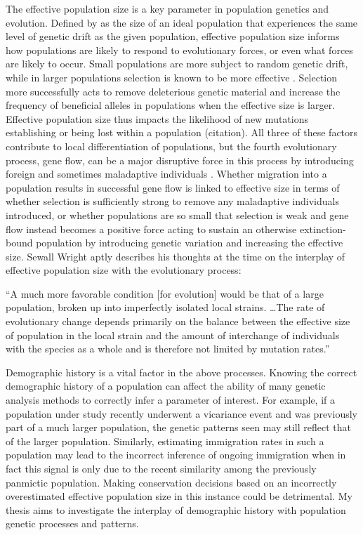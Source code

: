 The effective population size is a key parameter in population genetics and evolution. Defined by \citet{Wright:1931} as the size of an ideal population that experiences the same level of genetic drift as the given population, effective population size informs how populations are likely to respond to evolutionary forces, or even what forces are likely to occur. Small populations are more subject to random genetic drift, while in larger populations selection is known to be more effective \citep{Gravel:2016}. Selection more successfully acts to remove deleterious genetic material and increase the frequency of beneficial alleles in populations when the effective size is larger. Effective population size thus impacts the likelihood of new mutations establishing or being lost within a population (\color{red}citation\color{black}). All three of these factors contribute to local differentiation of populations, but the fourth evolutionary process, gene flow, can be a major disruptive force in this process by introducing foreign and sometimes maladaptive individuals \citep{Slatkin:1987}. Whether migration into a population results in successful gene flow is linked to effective size in terms of whether selection is sufficiently strong to remove any maladaptive individuals introduced, or whether populations are so small that selection is weak and gene flow instead becomes a positive force acting to sustain an otherwise extinction-bound population by introducing genetic variation and increasing the effective size. Sewall Wright aptly describes his thoughts at the time on the interplay of effective population size with the evolutionary process:
\begin{quoteshrink}
  ``A much more favorable condition [for evolution] would be that of a large population, broken up into imperfectly isolated local strains. \ldots The rate of evolutionary change depends primarily on the balance between the effective size of population in the local strain and the amount of interchange of individuals with the species as a whole and is therefore not limited by mutation rates.''
  \hfill\citet{Wright:1930}
\end{quoteshrink}

Demographic history is a vital factor in the above processes. Knowing the correct demographic history of a population can affect the ability of many genetic analysis methods to correctly infer a parameter of interest. For example, if a population under study recently underwent a vicariance event and was previously part of a much larger population, the genetic patterns seen may still reflect that of the larger population. Similarly, estimating immigration rates in such a population may lead to the incorrect inference of ongoing immigration when in fact this signal is only due to the recent similarity among the previously panmictic population. Making conservation decisions based on an incorrectly overestimated effective population size in this instance could be detrimental. My thesis aims to investigate the interplay of demographic history with population genetic processes and patterns.

